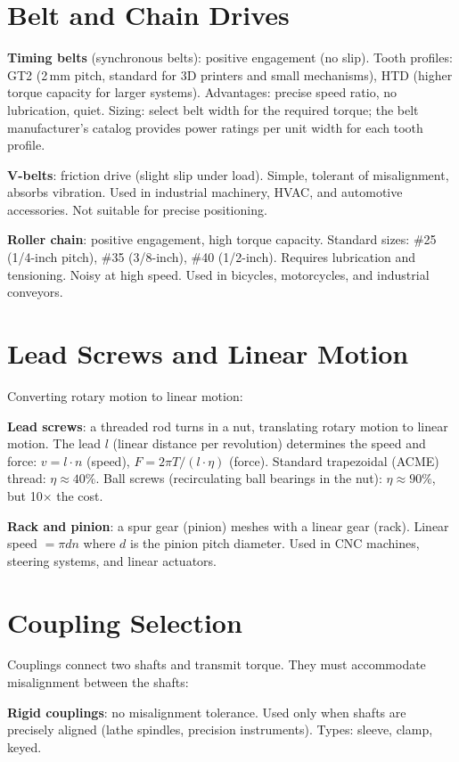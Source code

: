 \section{Belt and Chain Drives}
\textbf{Timing belts} (synchronous belts): positive engagement (no slip). Tooth profiles: GT2 (2\,mm pitch, standard for 3D printers and small mechanisms), HTD (higher torque capacity for larger systems). Advantages: precise speed ratio, no lubrication, quiet. Sizing: select belt width for the required torque; the belt manufacturer's catalog provides power ratings per unit width for each tooth profile.

\textbf{V-belts}: friction drive (slight slip under load). Simple, tolerant of misalignment, absorbs vibration. Used in industrial machinery, HVAC, and automotive accessories. Not suitable for precise positioning.

\textbf{Roller chain}: positive engagement, high torque capacity. Standard sizes: \#25 (1/4-inch pitch), \#35 (3/8-inch), \#40 (1/2-inch). Requires lubrication and tensioning. Noisy at high speed. Used in bicycles, motorcycles, and industrial conveyors.

\section{Lead Screws and Linear Motion}
Converting rotary motion to linear motion:

\textbf{Lead screws}: a threaded rod turns in a nut, translating rotary motion to linear motion. The lead $l$ (linear distance per revolution) determines the speed and force: $v = l \cdot n$ (speed), $F = 2\pi T/(l \cdot \eta)$ (force). Standard trapezoidal (ACME) thread: $\eta \approx 40\%$. Ball screws (recirculating ball bearings in the nut): $\eta \approx 90\%$, but 10$\times$ the cost.

\textbf{Rack and pinion}: a spur gear (pinion) meshes with a linear gear (rack). Linear speed $= \pi d n$ where $d$ is the pinion pitch diameter. Used in CNC machines, steering systems, and linear actuators.

\section{Coupling Selection}
Couplings connect two shafts and transmit torque. They must accommodate misalignment between the shafts:

\textbf{Rigid couplings}: no misalignment tolerance. Used only when shafts are precisely aligned (lathe spindles, precision instruments). Types: sleeve, clamp, keyed.


